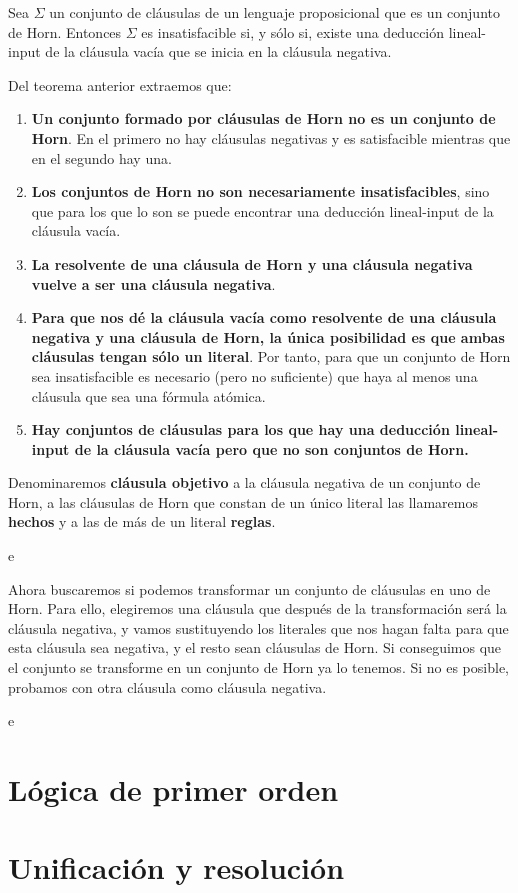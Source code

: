 \begin{nth}
    Sea $\Sigma$ un conjunto de cláusulas de un lenguaje proposicional que es un conjunto de Horn. Entonces $\Sigma$ es insatisfacible si, y sólo si, existe una deducción lineal-input de la cláusula vacía que se inicia en la cláusula negativa.
\end{nth}
\begin{obs} Del teorema anterior extraemos que:
    \begin{enumerate}
        \item \textbf{Un conjunto formado por cláusulas de Horn no es un conjunto de Horn}. En el primero no hay cláusulas negativas y es satisfacible mientras que en el segundo hay una.
        \item \textbf{Los conjuntos de Horn no son necesariamente insatisfacibles}, sino que para los que lo son se puede encontrar una deducción lineal-input de la cláusula vacía.
        \item \textbf{La resolvente de una cláusula de Horn y una cláusula negativa vuelve a ser una cláusula negativa}.
        \item \textbf{Para que nos dé la cláusula vacía como resolvente de una cláusula negativa y una cláusula de Horn, la única posibilidad es que ambas cláusulas tengan sólo un literal}. Por tanto, para que un conjunto de Horn sea insatisfacible es necesario (pero no suficiente) que haya al menos una cláusula que sea una fórmula atómica.
        \item \textbf{Hay conjuntos de cláusulas para los que hay una deducción lineal-input de la cláusula vacía pero que no son conjuntos de Horn.}
    \end{enumerate}
\end{obs}
Denominaremos \textbf{cláusula objetivo} a la cláusula negativa de un conjunto de Horn, a las cláusulas de Horn que constan de un único literal las llamaremos \textbf{hechos} y a las de más de un literal \textbf{reglas}.
\begin{ejemplo}
    e
\end{ejemplo}

Ahora buscaremos si podemos transformar un conjunto de cláusulas en uno de Horn. Para ello, elegiremos una cláusula que después de la transformación será la cláusula negativa, y vamos sustituyendo los literales que nos hagan falta para que esta cláusula sea negativa, y el resto sean cláusulas de Horn. Si conseguimos que el conjunto se transforme en un conjunto de Horn ya lo tenemos. Si no es posible, probamos con otra cláusula como cláusula negativa.
\begin{ejemplo}
    e
\end{ejemplo}

\newpage
\section{Lógica de primer orden}


\newpage
\section{Unificación y resolución}